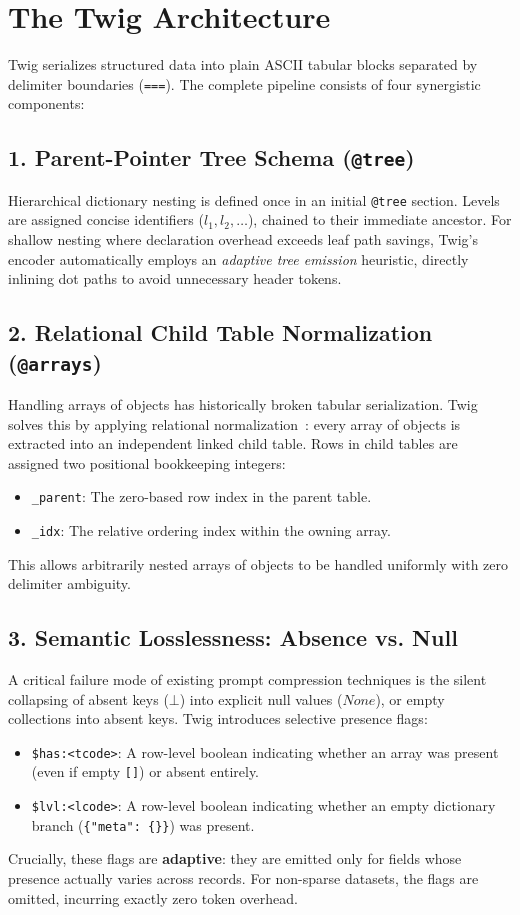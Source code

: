 \documentclass[11pt,a4paper]{article}
\begin{document}
\section{The Twig Architecture}

Twig serializes structured data into plain ASCII tabular blocks separated by delimiter boundaries (\texttt{===}). The complete pipeline consists of four synergistic components:

\subsection{1. Parent-Pointer Tree Schema (\texttt{@tree})}
Hierarchical dictionary nesting is defined once in an initial \texttt{@tree} section. Levels are assigned concise identifiers ($l_1, l_2, \dots$), chained to their immediate ancestor. For shallow nesting where declaration overhead exceeds leaf path savings, Twig's encoder automatically employs an \textit{adaptive tree emission} heuristic, directly inlining dot paths to avoid unnecessary header tokens.

\subsection{2. Relational Child Table Normalization (\texttt{@arrays})}
Handling arrays of objects has historically broken tabular serialization. Twig solves this by applying relational normalization~\cite{codd1970relational}: every array of objects is extracted into an independent linked child table. Rows in child tables are assigned two positional bookkeeping integers:
\begin{itemize}
    \item \texttt{\_parent}: The zero-based row index in the parent table.
    \item \texttt{\_idx}: The relative ordering index within the owning array.
\end{itemize}
This allows arbitrarily nested arrays of objects to be handled uniformly with zero delimiter ambiguity.

\subsection{3. Semantic Losslessness: Absence vs. Null}
A critical failure mode of existing prompt compression techniques is the silent collapsing of absent keys ($\bot$) into explicit null values ($None$), or empty collections into absent keys. Twig introduces selective presence flags:
\begin{itemize}
    \item \texttt{\$has:<tcode>}: A row-level boolean indicating whether an array was present (even if empty \texttt{[]}) or absent entirely.
    \item \texttt{\$lvl:<lcode>}: A row-level boolean indicating whether an empty dictionary branch (\texttt{\{"meta": \{\}\}}) was present.
\end{itemize}
Crucially, these flags are \textbf{adaptive}: they are emitted only for fields whose presence actually varies across records. For non-sparse datasets, the flags are omitted, incurring exactly zero token overhead.
\end{document}
